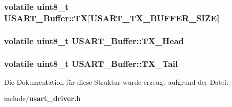 \subsubsection[{TX}]{\setlength{\rightskip}{0pt plus 5cm}volatile uint8\_\-t {\bf USART\_\-Buffer::TX}[USART\_\-TX\_\-BUFFER\_\-SIZE]}\label{struct_u_s_a_r_t___buffer_af3756c298a35ef0f5550debc974836df}
\subsubsection[{TX\_\-Head}]{\setlength{\rightskip}{0pt plus 5cm}volatile uint8\_\-t {\bf USART\_\-Buffer::TX\_\-Head}}\label{struct_u_s_a_r_t___buffer_a904faab026b65aebf0b5281494a59234}
\subsubsection[{TX\_\-Tail}]{\setlength{\rightskip}{0pt plus 5cm}volatile uint8\_\-t {\bf USART\_\-Buffer::TX\_\-Tail}}\label{struct_u_s_a_r_t___buffer_a4f1f65b0efc9a9ae82817b77acc05dde}


Die Dokumentation für diese Struktur wurde erzeugt aufgrund der Datei:\begin{DoxyCompactItemize}
\item 
include/{\bf usart\_\-driver.h}\end{DoxyCompactItemize}
